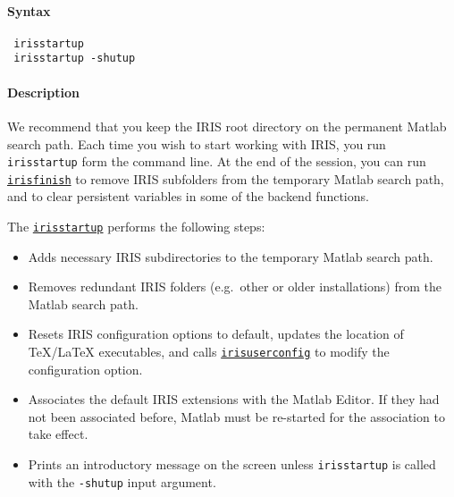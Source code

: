 


	\paragraph{Syntax}
 
 \begin{verbatim}
 irisstartup
 irisstartup -shutup
 \end{verbatim}
 
 \paragraph{Description}
 
 We recommend that you keep the IRIS root directory on the permanent
 Matlab search path. Each time you wish to start working with IRIS, you
 run \texttt{irisstartup} form the command line. At the end of the
 session, you can run \href{config/irisfinish}{\texttt{irisfinish}} to
 remove IRIS subfolders from the temporary Matlab search path, and to
 clear persistent variables in some of the backend functions.
 
 The \href{config/irisstartup}{\texttt{irisstartup}} performs the
 following steps:
 
 \begin{itemize}
 \item
   Adds necessary IRIS subdirectories to the temporary Matlab search
   path.
 \item
   Removes redundant IRIS folders (e.g.~other or older installations)
   from the Matlab search path.
 \item
   Resets IRIS configuration options to default, updates the location of
   TeX/LaTeX executables, and calls
   \href{config/irisuserconfighelp}{\texttt{irisuserconfig}} to modify
   the configuration option.
 \item
   Associates the default IRIS extensions with the Matlab Editor. If they
   had not been associated before, Matlab must be re-started for the
   association to take effect.
 \item
   Prints an introductory message on the screen unless
   \texttt{irisstartup} is called with the \texttt{-shutup} input
   argument.
 \end{itemize}


